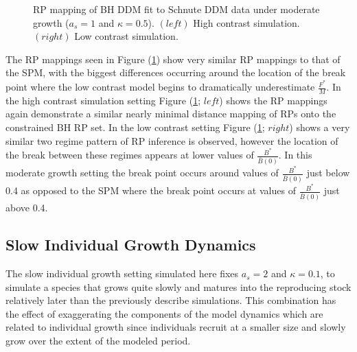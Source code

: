\begin{figure}[h!]
\begin{minipage}[h!]{0.09\textwidth}
\end{minipage}
\caption{
RP mapping of BH DDM fit to Schnute DDM data under moderate growth ($a_s=1$ and $\kappa=0.5$).
$(left)$ High contrast simulation.
$(right)$ Low contrast simulation.
}\label{moderateGrowth}
\end{figure}

%
The RP mappings seen in Figure (\ref{moderateGrowth}) show very similar RP mappings
to that of the SPM, with the biggest differences occurring
around the location of the break point where the low contrast model begins to
dramatically underestimate $\frac{F^*}{M}$.
%
In the high contrast simulation setting Figure (\ref{moderateGrowth}; $left$) shows
the RP mappings again demonstrate a similar nearly minimal distance mapping of
RPs onto the constrained BH RP set. In the low contrast setting Figure (\ref{moderateGrowth}; $right$) 
shows a very similar two regime pattern of RP inference is observed, however the
location of the break between these regimes appears at lower values of
$\frac{B^*}{\bar B(0)}$. In this moderate growth setting the break point
occurs around values of $\frac{B^*}{\bar B(0)}$ just below 0.4 as opposed to 
the SPM where the break point occurs at values of $\frac{B^*}{\bar B(0)}$ just above 0.4.


\subsection{Slow Individual Growth Dynamics\label{slow}}

%
The slow individual growth setting simulated here fixes $a_s=2$ and $\kappa=0.1$, to
simulate a species that grows quite slowly and matures into the reproducing  
stock relatively later than the previously describe simulations. This combination has 
the effect of exaggerating the components of the model dynamics which are related to
individual growth since individuals recruit at a smaller size and slowly
grow over the extent of the modeled period.

